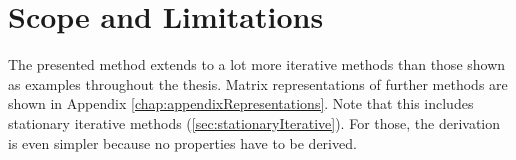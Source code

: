 %
%
%


\section{Scope and Limitations}
\label{sec:scopeLimitations}

The presented method extends to a lot more iterative methods than those shown as examples throughout the thesis. Matrix representations of further methods are shown in Appendix \ref{chap:appendixRepresentations}. Note that this includes stationary iterative methods (\ref{sec:stationaryIterative}). For those, the derivation is even simpler because no properties have to be derived.

